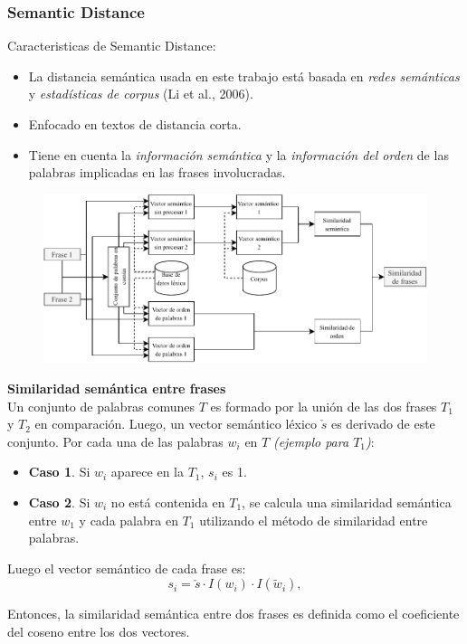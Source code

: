 \begin{frame}[allowframebreaks]
	\frametitle{Semantic Distance}
	Caracteristicas de Semantic Distance:
	\bigskip
	\begin{itemize}[<*>]
		\item La distancia semántica usada en este trabajo está basada en \textit{redes semánticas} y \textit{estadísticas de corpus} (Li et al., 2006).
		\item Enfocado en textos de distancia corta.
		\item Tiene en cuenta la \textit{información semántica} y la \textit{información del orden} de las palabras implicadas en las frases involucradas.
	\end{itemize}

	\begin{figure}
		\centering
		\includegraphics[width=0.7\linewidth]{../7_marco_teorico/imagenes/similaridad_sematinca_metodo}
		\label{fig:similaridadsematincametodo}
	\end{figure}

	\framebreak

	\textbf{Similaridad semántica entre frases} \\
	\bigskip
		Un conjunto de palabras comunes \(T\) es formado por la unión de las dos frases \(T_1\) y \(T_2\) en comparación. Luego, un vector semántico léxico \(\check{s}\) es derivado de este conjunto. Por cada una de las palabras \(w_i\) en \(T\) \textit{(ejemplo para \(T_1\))}:
	\begin{itemize}[<*>]
		\item \textbf{Caso 1}. Si \(w_i\) aparece en la \(T_1\), \(s_i\) es 1.
		\item \textbf{Caso 2}. Si \(w_i\) no está contenida en \(T_1\), se calcula una similaridad semántica entre \(w_1\) y cada palabra en \(T_1\) utilizando el método de similaridad entre palabras.
	\end{itemize}

	\bigskip
	Luego el vector semántico de cada frase es:
	\[s_i = \check{s} \cdot I(w_i) \cdot I(\widetilde{w}_i),\]

	Entonces, la similaridad semántica entre dos frases es definida como el coeficiente del coseno entre los dos vectores.


\end{frame}
